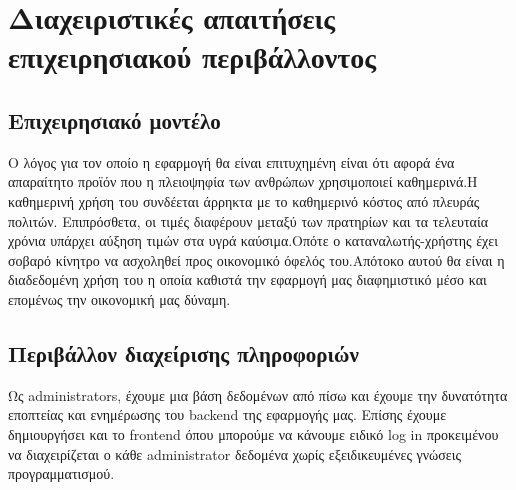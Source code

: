 \section{Διαχειριστικές απαιτήσεις επιχειρησιακού περιβάλλοντος}

\subsection{Επιχειρησιακό μοντέλο}
Ο λόγος για τον οποίο η εφαρμογή θα είναι επιτυχημένη είναι ότι  αφορά ένα απαραίτητο προϊόν που η πλειοψηφία των ανθρώπων χρησιμοποιεί καθημερινά.Η καθημερινή χρήση του συνδέεται άρρηκτα με το καθημερινό κόστος από πλευράς πολιτών.  Επιπρόσθετα, οι τιμές διαφέρουν μεταξύ των πρατηρίων και τα τελευταία χρόνια υπάρχει αύξηση τιμών στα υγρά καύσιμα.Οπότε ο καταναλωτής-χρήστης έχει σοβαρό κίνητρο να ασχοληθεί προς οικονομικό όφελός του.Απότοκο αυτού θα είναι η διαδεδομένη χρήση του η οποία καθιστά την εφαρμογή μας διαφημιστικό μέσο και επομένως την οικονομική μας δύναμη.



\subsection{Περιβάλλον διαχείρισης πληροφοριών}
Ως administrators, έχουμε μια βάση δεδομένων από πίσω και έχουμε την δυνατότητα εποπτείας και ενημέρωσης του backend της εφαρμογής μας. Επίσης έχουμε δημιουργήσει και το frontend όπου μπορούμε να κάνουμε ειδικό log in προκειμένου να διαχειρίζεται ο κάθε administrator δεδομένα χωρίς εξειδικευμένες γνώσεις προγραμματισμού.



